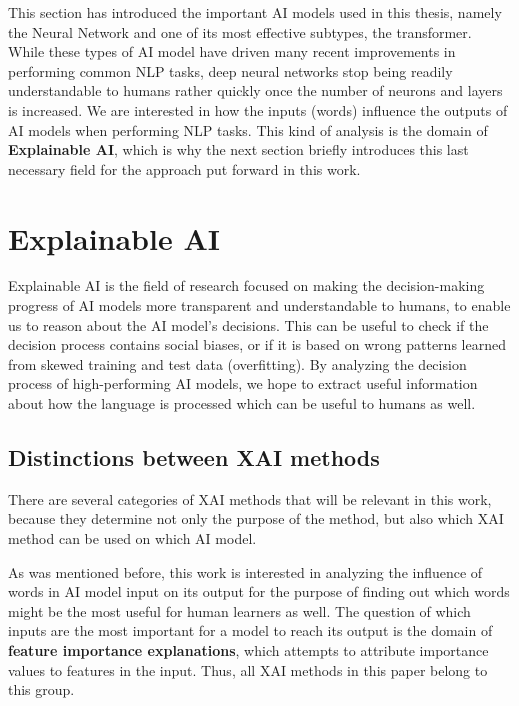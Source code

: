 This section has introduced the important AI models used in this thesis, namely the Neural Network and one of its most effective subtypes, the transformer.
While these types of AI model have driven many recent improvements in performing common NLP tasks, deep neural networks stop being readily understandable to humans rather quickly once the number of neurons and layers is increased.
We are interested in how the inputs (words) influence the outputs of AI models when performing NLP tasks.
This kind of analysis is the domain of \textbf{Explainable AI}, which is why the next section briefly introduces this last necessary field for the approach put forward in this work.

\section{Explainable AI} \label{sec:explainable-ai}
Explainable AI is the field of research focused on making the decision-making progress of AI models more transparent and understandable to humans, to enable us to reason about the AI model's decisions. 
This can be useful to check if the decision process contains social biases, or if it is based on wrong patterns learned from skewed training and test data (overfitting).
By analyzing the decision process of high-performing AI models, we hope to extract useful information about how the language is processed which can be useful to humans as well.

\subsection{Distinctions between XAI methods}
There are several categories of XAI methods that will be relevant in this work, because they determine not only the purpose of the method, but also which XAI method can be used on which AI model.

As was mentioned before, this work is interested in analyzing the influence of words in AI model input on its output for the purpose of finding out which words might be the most useful for human learners as well.
The question of which inputs are the most important for a model to reach its output is the domain of \textbf{feature importance explanations}, which attempts to attribute importance values to features in the input.
Thus, all XAI methods in this paper belong to this group.


